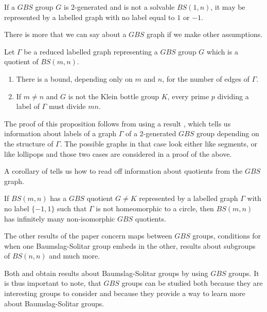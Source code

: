 \begin{lemma}\cite[Lemma 2.8]{Le15}
    If a $GBS$ group $G$ is $2$-generated and is not a solvable $BS(1,n)$, it may be represented by a labelled graph with no label equal to $1$ or $-1$.
\end{lemma}

There is more that we can say about a $GBS$ graph if we make other assumptions.

\begin{proposition}\cite[Proposition 5.1]{Le15}
    Let $\Gamma$ be a reduced labelled graph representing a $GBS$ group $G$ which is a quotient of $BS(m,n)$.
    \begin{enumerate}
        \item There is a bound, depending only on $m$ and $n$, for the number of edges of $\Gamma$.
        \item If $m \neq n$ and $G$ is not the Klein bottle group $K$, every prime $p$ dividing a label of $\Gamma$ must divide $mn$.
    \end{enumerate}
\end{proposition}

\begin{remark}
    The proof of this proposition follows from using a result \cite[Theorem 4.1]{Le15}, which tells us information about labels of a graph $\Gamma$ of a $2$-generated $GBS$ group depending on the structure of $\Gamma$. The possible graphs in that case look either like segments, or like lollipops and those two cases are considered in a proof of the above.
\end{remark}

A corollary of \cite[Proposition 5.6]{Le15} tells us how to read off information about quotients from the $GBS$ graph.

\begin{corollary}\cite[Corollary 5.7]{Le15}
    If $BS(m,n)$ has a $GBS$ quotient $G \neq K$ represented by a labelled graph $\Gamma$ with no label $\{-1,1\}$ such that $\Gamma$ is not homeomorphic to a circle, then $BS(m,n)$ has infinitely many non-isomorphic $GBS$ quotients.
\end{corollary}

\begin{remark}
    The other results of the paper concern maps between $GBS$ groups, conditions for when one Baumslag-Solitar group embeds in the other, results about subgroups of $BS(n,n)$ and much more.
\end{remark}

Both \cite{Le15} and \cite{WH01} obtain results about Baumslag-Solitar groups by using $GBS$ groups. It is thus important to note, that $GBS$ groups can be studied both because they are interesting groups to consider and because they provide a way to learn more about Baumslag-Solitar groups.


